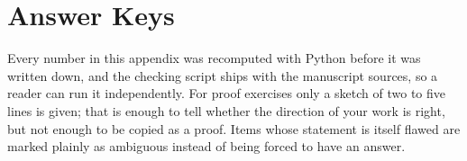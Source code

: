 \chapter{Answer Keys}
\label{app:kunci}

Every number in this appendix was recomputed with Python before it was written down, and the
checking script ships with the manuscript sources, so a reader can run it independently. For
proof exercises only a sketch of two to five lines is given; that is enough to tell whether
the direction of your work is right, but not enough to be copied as a proof. Items whose
statement is itself flawed are marked plainly as ambiguous instead of being forced to have
an answer.





